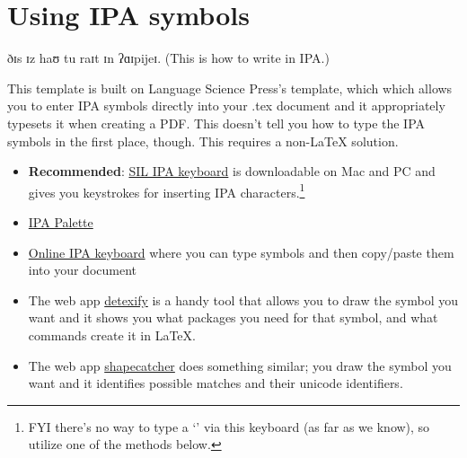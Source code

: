 \documentclass[output=paper,colorlinks,citecolor=brown]{langscibook}
\begin{document}
\section{Using IPA symbols} \label{sec:diercks:fonts}

\ea 
ðɪs ɪz haʊ tu raɪt ɪn ʔɑɪpijeɪ. (This is how to write in IPA.)
\z 

\noindent This template is built on Language Science Press's template, which which allows you to enter IPA symbols directly into your .tex document and it appropriately typesets it when creating a PDF. This doesn't tell you how to type the IPA symbols in the first place, though. This requires a non-\LaTeX{} solution.

\begin{itemize}

    \item \textbf{Recommended}: \href{https://scripts.sil.org/cms/scripts/page.php?site_id=nrsi&id=uniipakeyboard}{SIL IPA keyboard} is downloadable on Mac and PC and gives you keystrokes for inserting IPA characters.\footnote{FYI there's no way to type a `\textrhookschwa' via this keyboard (as far as we know), so utilize one of the methods below.}
    
    \item \href{https://www.blugs.com/IPA/}{IPA Palette}
    
    \item \href{https://ipa.typeit.org}{Online IPA keyboard} where you can type symbols and then copy/paste them into your document
    
    \item The web app \href{http://detexify.kirelabs.org/classify.html}{detexify} is a handy tool that allows you to draw the symbol you want and it shows you what packages you need for that symbol, and what commands create it in \LaTeX{}.
    
    \item The web app \href{https://shapecatcher.com}{shapecatcher} does something similar; you draw the symbol you want and it identifies possible matches and their unicode identifiers.
    
    

\end{itemize}

\end{document}
